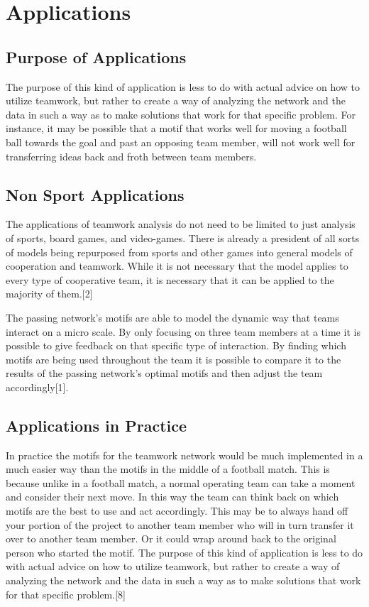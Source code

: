 \documentclass{mcmthesis}
\begin{document}
\section{Applications}

\subsection{Purpose of Applications}
	The purpose of this kind of application is less to do with actual advice on how to utilize teamwork, but rather to create a way of analyzing the network and the data in such a way as to make solutions that work for that specific problem. For instance, it may be possible that a motif that works well for moving a football ball towards the goal and past an opposing team member, will not work well for transferring ideas back and froth between team members.
\subsection{Non Sport Applications}
	The applications of teamwork analysis do not need to be limited to just analysis of sports, board games, and video-games. There is already a president of all sorts of models being repurposed from sports and other games into general models of cooperation and teamwork. While it is not necessary that the model applies to every type of cooperative team, it is necessary that it can be applied to the majority of them.[2]

	The passing network’s motifs are able to model the dynamic way that teams interact on a micro scale. By only focusing on three team members at a time it is possible to give feedback on that specific type of interaction. By finding which motifs are being used throughout the team it is possible to compare it to the results of the passing network’s optimal motifs and then adjust the team accordingly[1]. 
\subsection{Applications in Practice}
	In practice the motifs for the teamwork network would be much implemented in a much easier way than the motifs in the middle of a football match. This is because unlike in a football match, a normal operating team can take a moment and consider their next move. In this way the team can think back on which motifs are the best to use and act accordingly. This may be to always hand off your portion of the project to another team member who will in turn transfer it over to another team member. Or it could wrap around back to the original person who started the motif. 
	The purpose of this kind of application is less to do with actual advice on how to utilize teamwork, but rather to create a way of analyzing the network and the data in such a way as to make solutions that work for that specific problem.[8] 
\end{document}
